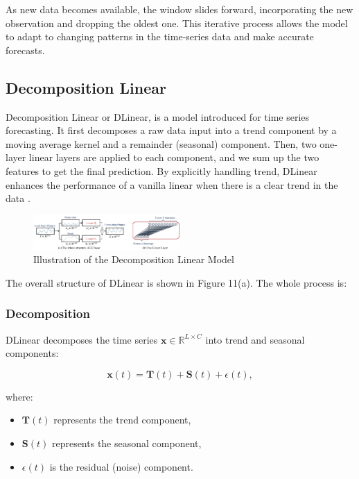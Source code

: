 \documentclass{ieeeojies}
\begin{document}
As new data becomes available, the window slides forward, incorporating the new observation and dropping the oldest one. This iterative process allows the model to adapt to changing patterns in the time-series data and make accurate forecasts.


\subsection{Decomposition Linear}
Decomposition Linear or DLinear, is a model introduced for time series forecasting.  It first decomposes a raw data input into a trend component by a moving average kernel and a remainder (seasonal) component. Then, two
one-layer linear layers are applied to each component,
and we sum up the two features to get the final prediction. By explicitly handling trend, DLinear enhances
the performance of a vanilla linear when there is a clear
trend in the data \cite{b15}.

\begin{figure} [H]
    \centering
    \includegraphics[width=0.5\textwidth]{bibliography/Figure/Illu_DLinear.png}
    \caption{Illustration of the Decomposition Linear Model}
    \label{fig:DLinear Illustration}
\end{figure}

The overall structure of DLinear is shown in Figure 11(a). The whole process is:

\subsubsection{Decomposition}
DLinear decomposes the time series $\mathbf{x} \in \mathbb{R}^{L \times C}$ into trend and seasonal components:

\begin{equation}
    \mathbf{x}(t) = \mathbf{T}(t) + \mathbf{S}(t) + \epsilon(t),
\end{equation}

where:
\begin{itemize}
    \item $\mathbf{T}(t)$ represents the trend component,
    \item $\mathbf{S}(t)$ represents the seasonal component,
    \item $\epsilon(t)$ is the residual (noise) component.
\end{itemize}
\end{document}
